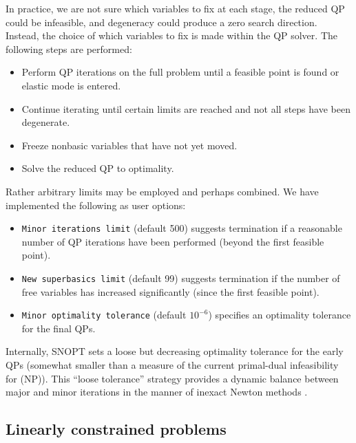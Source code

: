 \documentclass[draft,leqno,onefignum,onetabnum]{siamltex}
\def\D{_{\scriptscriptstyle D}}
\def\P{_{\scriptscriptstyle P}}
\def\v#1{\texttt{#1}}
\def\SNOPT {{\small SNOPT}}
\begin{document}
In practice, we are not sure which variables to fix at each stage,
the reduced QP could be infeasible, and degeneracy could
produce a zero search direction.
Instead, the choice of which variables to fix is made within
the QP solver. The following steps are performed:
%
\begin{itemize}
\item Perform QP iterations on the full problem until a feasible
      point is found or elastic mode is entered.
\item Continue iterating until certain limits are reached
      and not all steps have been degenerate.
\item Freeze nonbasic variables that have not yet moved.
\item Solve the reduced QP to optimality.
\end{itemize}
Rather arbitrary limits may be employed and perhaps combined.
We have implemented the following as user options:
%
\begin{itemize}
\item \v{Minor iterations limit} (default 500) suggests termination
      if a reasonable number of QP iterations have been performed
      (beyond the first feasible point).
\item \v{New superbasics limit} (default 99) suggests termination
      if the number of free variables has increased significantly
      (since the first feasible point).
\item \v{Minor optimality tolerance} (default $10^{-6}$) specifies an
      optimality tolerance for the final QPs.
\end{itemize}
%
Internally, \SNOPT{} sets a loose but decreasing
optimality tolerance for the early QPs (somewhat smaller
than a measure of the current primal-dual infeasibility for (NP))\@.
This ``loose tolerance'' strategy provides a dynamic balance between
major and minor iterations in the manner of inexact Newton methods
\cite{DemES82}.

\subsection{Linearly constrained problems} \label{sec-linear-constraints}
\end{document}
